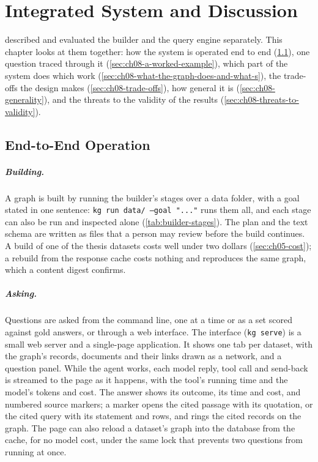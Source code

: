\chapter{Integrated System and Discussion}\label{ch08}

 described and evaluated the builder and the query engine separately. This chapter
looks at them together: how the system is operated end to end (\cref{sec:ch08-end-to-end-operation}), one question
traced through it (\cref{sec:ch08-a-worked-example}), which part of the system does which work
(\cref{sec:ch08-what-the-graph-does-and-what-s}), the trade-offs the design makes
(\cref{sec:ch08-trade-offs}), how general it is (\cref{sec:ch08-generality}), and the threats to the validity of the
results (\cref{sec:ch08-threats-to-validity}).

\section{End-to-End Operation}\label{sec:ch08-end-to-end-operation}

\paragraph{Building.} A graph is built by running the builder's stages over a data folder, with a goal stated in one
sentence: \texttt{kg run data/ --goal "..."} runs them all, and each stage can also be run and inspected alone
(\cref{tab:builder-stages}). The plan and the text schema are written as files that a person may review before the
build continues. A build of one of the thesis datasets costs well under two dollars (\cref{sec:ch05-cost}); a rebuild
from the response cache costs nothing and reproduces the same graph, which a content digest confirms.

\paragraph{Asking.} Questions are asked from the command line, one at a time or as a set scored against gold
answers, or through a web interface. The interface (\texttt{kg serve}) is a small web server and a single-page
application. It shows one tab per dataset, with the graph's records, documents and their links drawn as a network, and
a question panel. While the agent works, each model reply, tool call and send-back is streamed to the page as it
happens, with the tool's running time and the model's tokens and cost. The answer shows its outcome, its time and
cost, and numbered source markers; a marker opens the cited passage with its quotation, or the cited query with its
statement and rows, and rings the cited records on the graph. The page can also reload a dataset's graph into the
database from the cache, for no model cost, under the same lock that prevents two questions from running at once.

